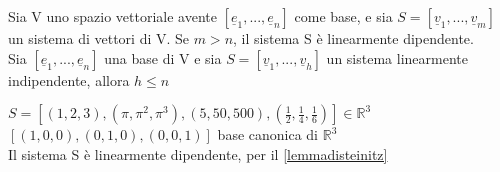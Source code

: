   \begin{lemma}[Steinitz]\label{lemmadisteinitz}
    Sia V uno spazio vettoriale avente
    $[\underline{e}_1,...,\underline{e}_n]$ come base, e sia
    $S=[\underline{v}_1,...,\underline{v}_m]$ un sistema di vettori
    di V. Se $m>n$, il sistema S è linearmente dipendente.\\
    Sia $[\underline{e}_1,...,\underline{e}_n]$ una base di V e sia
    $S=[\underline{v}_1,...,\underline{v}_h]$ un sistema linearmente
    indipendente, allora $h\leq n$
    \begin{es}
      $S=[(1,2,3),(\pi,\pi^2,\pi^3),(5,50,500),(\frac{1}{2},\frac{1}{4},\frac{1}{6})]\in\mathbb{R}^3$\\
      $[(1,0,0),(0,1,0),(0,0,1)]$ base canonica di $\mathbb{R}^3$\\
      Il sistema S è linearmente dipendente, per il \ref{lemmadisteinitz}
    \end{es}
  \end{lemma}

